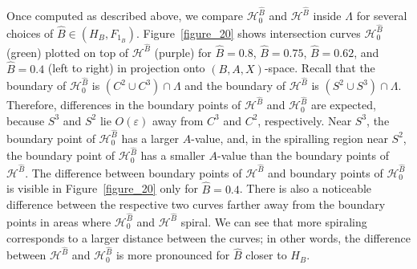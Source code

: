 \documentclass{ws-ijbc}
\begin{document}
Once computed as described above, we compare $\mathscr{H}_0^{\widehat{B}}$ and $\mathscr{H}^{\widehat{B}}$ inside $\Lambda$ for several choices of $\widehat{B} \in (H_B, F_{1_B})$.  Figure~\ref{figure_20} shows intersection curves $\mathscr{H}_0^{\widehat{B}}$ (green) plotted on top of $\mathscr{H}^{\widehat{B}}$ (purple) for $\widehat{B}=0.8$, $\widehat{B}=0.75$, $\widehat{B}=0.62$, and $\widehat{B}=0.4$ (left to right) in projection onto $(B,A,X)$-space.  Recall that the boundary of $\mathscr{H}^{\widehat{B}}_0$ is $(C^2 \cup C^3) \cap \Lambda$ and the boundary of $\mathscr{H}^{\widehat{B}}$ is $(S^2 \cup S^3) \cap \Lambda$.  Therefore, differences in the boundary points of  $\mathscr{H}^{\widehat{B}}$ and $\mathscr{H}_0^{\widehat{B}}$ are expected, because $S^3$ and $S^2$ lie $O(\varepsilon)$ away from $C^3$ and $C^2$, respectively.  Near $S^3$, the boundary point of $\mathscr{H}_0^{\widehat{B}}$ has a larger $A$-value, and, in the spiralling region near $S^2$, the boundary point of $\mathscr{H}_0^{\widehat{B}}$ has a smaller $A$-value than the boundary points of $\mathscr{H}^{\widehat{B}}$.  The difference between boundary points of $\mathscr{H}^{\widehat{B}}$ and boundary points of $\mathscr{H}_0^{\widehat{B}}$ is visible in Figure~\ref{figure_20} only for $\widehat{B}=0.4$. There is also a noticeable difference between the respective two curves farther away from the boundary points in areas where $\mathscr{H}^{\widehat{B}}_0$ and $\mathscr{H}^{\widehat{B}}$ spiral.  We can see that more spiraling corresponds to a larger distance between the curves; in other words, the difference between $\mathscr{H}^{\widehat{B}}$ and $\mathscr{H}_0^{\widehat{B}}$ is more pronounced for $\widehat{B}$ closer to $H_B$.
\end{document}
